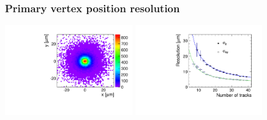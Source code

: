 \documentclass{beamer}
\begin{document}
\begin{frame}
\frametitle{Primary vertex position resolution}
\includegraphics[width=5.5cm]{Primary_Vertex_Position_XY.pdf}
\includegraphics[width=5.5cm]{Primary_Vertex_Resolution.pdf}
\end{frame}
\end{document}
